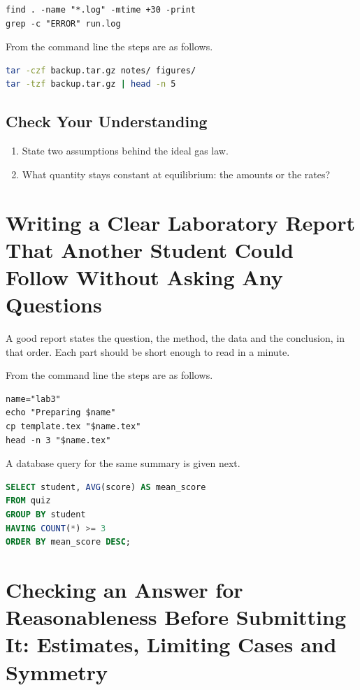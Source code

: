 \documentclass[11pt]{article}
\begin{document}
{\small\begin{verbatim}
find . -name "*.log" -mtime +30 -print
grep -c "ERROR" run.log
\end{verbatim}}

From the command line the steps are as follows.

\begin{lstlisting}[language=bash]
tar -czf backup.tar.gz notes/ figures/
tar -tzf backup.tar.gz | head -n 5
\end{lstlisting}

\subsection*{Check Your Understanding}
\begin{enumerate}
\item State two assumptions behind the ideal gas law.
\item What quantity stays constant at equilibrium: the amounts or the rates?
\end{enumerate}

\section{Writing a Clear Laboratory Report That Another Student Could Follow Without Asking Any Questions}

A good report states the question, the method, the data and the conclusion, in that order. Each part should be short enough to read in a minute.

From the command line the steps are as follows.

{\small\begin{verbatim}
name="lab3"
echo "Preparing $name"
cp template.tex "$name.tex"
head -n 3 "$name.tex" 
\end{verbatim}}

A database query for the same summary is given next.

\begin{lstlisting}[language=SQL]
SELECT student, AVG(score) AS mean_score
FROM quiz
GROUP BY student
HAVING COUNT(*) >= 3
ORDER BY mean_score DESC;
\end{lstlisting}

\section{Checking an Answer for Reasonableness Before Submitting It: Estimates, Limiting Cases and Symmetry}
\end{document}
